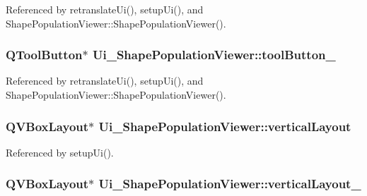 Referenced by retranslate\-Ui(), setup\-Ui(), and Shape\-Population\-Viewer\-::\-Shape\-Population\-Viewer().

\hypertarget{class_ui___shape_population_viewer_aef925f6808998b14c2f1a1777975a603}{
\subsubsection[{tool\-Button\-\_\-6}]{\setlength{\rightskip}{0pt plus 5cm}Q\-Tool\-Button$\ast$ Ui\-\_\-\-Shape\-Population\-Viewer\-::tool\-Button\-\_}}\label{class_ui___shape_population_viewer_aef925f6808998b14c2f1a1777975a603}


Referenced by retranslate\-Ui(), setup\-Ui(), and Shape\-Population\-Viewer\-::\-Shape\-Population\-Viewer().

\hypertarget{class_ui___shape_population_viewer_a6d6c91184d20792aeb28b7b5044f0abf}{
\subsubsection[{vertical\-Layout}]{\setlength{\rightskip}{0pt plus 5cm}Q\-V\-Box\-Layout$\ast$ Ui\-\_\-\-Shape\-Population\-Viewer\-::vertical\-Layout}}\label{class_ui___shape_population_viewer_a6d6c91184d20792aeb28b7b5044f0abf}


Referenced by setup\-Ui().

\hypertarget{class_ui___shape_population_viewer_a41bb6c41ce83be21aade5f5f1cc14b4b}{
\subsubsection[{vertical\-Layout\-\_\-2}]{\setlength{\rightskip}{0pt plus 5cm}Q\-V\-Box\-Layout$\ast$ Ui\-\_\-\-Shape\-Population\-Viewer\-::vertical\-Layout\-\_}}\label{class_ui___shape_population_viewer_a41bb6c41ce83be21aade5f5f1cc14b4b}


